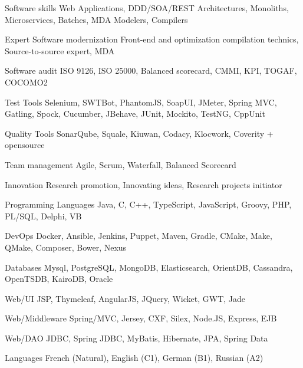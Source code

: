 

\begin{cvskills}

  \cvskill
  {Software skills} %
  {Web Applications, DDD/SOA/REST Architectures, Monoliths, Microservices, Batches, MDA Modelers, Compilers} %


  \cvskill
  {Expert Software modernization} %
  {Front-end and optimization compilation technics, Source-to-source expert, MDA} %


  \cvskill
  {Software audit} %
  {ISO 9126, ISO 25000, Balanced scorecard, CMMI, KPI, TOGAF, COCOMO2} %

  \cvskill
  {Test Tools} %
  {Selenium, SWTBot, PhantomJS, SoapUI, JMeter, Spring MVC, Gatling, Spock, Cucumber, JBehave, JUnit, Mockito, TestNG, CppUnit} %

  \cvskill
  {Quality Tools} %
  {SonarQube, Squale, Kiuwan, Codacy, Klocwork, Coverity + opensource} %


  \cvskill
  {Team management} %
  {Agile, Scrum, Waterfall, Balanced Scorecard} %

  \cvskill
  {Innovation} %
  {Research promotion, Innovating ideas, Research projects initiator} %

  \cvskill
  {Programming Languages} %
  {Java, C, C++, TypeScript, JavaScript, Groovy, PHP, PL/SQL, Delphi, VB} %
  
  \cvskill
  {DevOps} %
  {Docker, Ansible, Jenkins, Puppet, Maven, Gradle, CMake, Make, QMake, Composer, Bower, Nexus} %
  
  \cvskill
  {Databases} %
  {Mysql, PostgreSQL, MongoDB, Elasticsearch, OrientDB, Cassandra, OpenTSDB, KairoDB, Oracle} %
  
  \cvskill
  {Web/UI} %
  {JSP, Thymeleaf, AngularJS, JQuery, Wicket, GWT, Jade} %
  
  \cvskill
  {Web/Middleware} %
  {Spring/MVC, Jersey, CXF, Silex, Node.JS, Express, EJB} %
  
  
  \cvskill
  {Web/DAO} %
  {JDBC, Spring JDBC, MyBatis, Hibernate, JPA, Spring Data} %
  

  \cvskill
    {Languages} %
    {French (Natural), English (C1), German (B1), Russian (A2)} %

\end{cvskills}
